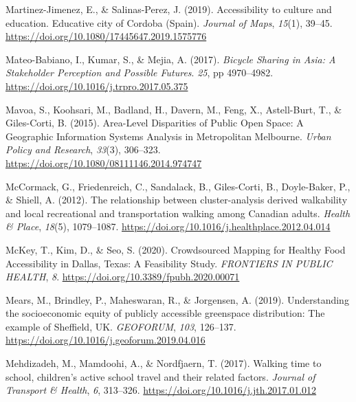 \documentclass[
  letterpaper,
  DIV=11,
  numbers=noendperiod]{scrartcl}
\newlength{\cslhangindent}
\newenvironment{CSLReferences}[2] %
 {\begin{list}{}{%
  \setlength{\itemindent}{0pt}
  \setlength{\leftmargin}{0pt}
  \setlength{\parsep}{0pt}
  \ifodd #1
   \setlength{\leftmargin}{\cslhangindent}
   \setlength{\itemindent}{-1\cslhangindent}
  \fi
  \setlength{\itemsep}{#2\baselineskip}}}
 {\end{list}}
\begin{document}
\begin{CSLReferences}{1}{0}
Martinez-Jimenez, E., \& Salinas-Perez, J. (2019). Accessibility to
culture and education. {Educative} city of {Cordoba} ({Spain}).
\emph{Journal of Maps}, \emph{15}(1), 39--45.
\url{https://doi.org/10.1080/17445647.2019.1575776}

Mateo-Babiano, I., Kumar, S., \& Mejia, A. (2017). \emph{Bicycle
{Sharing} in {Asia}: {A Stakeholder Perception} and {Possible Futures}}.
\emph{25}, pp 4970--4982.
\url{https://doi.org/10.1016/j.trpro.2017.05.375}

Mavoa, S., Koohsari, M., Badland, H., Davern, M., Feng, X., Astell-Burt,
T., \& Giles-Corti, B. (2015). Area-{Level Disparities} of {Public Open
Space}: {A Geographic Information Systems Analysis} in {Metropolitan
Melbourne}. \emph{Urban Policy and Research}, \emph{33}(3), 306--323.
\url{https://doi.org/10.1080/08111146.2014.974747}

McCormack, G., Friedenreich, C., Sandalack, B., Giles-Corti, B.,
Doyle-Baker, P., \& Shiell, A. (2012). The relationship between
cluster-analysis derived walkability and local recreational and
transportation walking among {Canadian} adults. \emph{Health \& Place},
\emph{18}(5), 1079--1087.
\url{https://doi.org/10.1016/j.healthplace.2012.04.014}

McKey, T., Kim, D., \& Seo, S. (2020). Crowdsourced {Mapping} for
{Healthy Food Accessibility} in {Dallas}, {Texas}: {A Feasibility
Study}. \emph{FRONTIERS IN PUBLIC HEALTH}, \emph{8}.
\url{https://doi.org/10.3389/fpubh.2020.00071}

Mears, M., Brindley, P., Maheswaran, R., \& Jorgensen, A. (2019).
Understanding the socioeconomic equity of publicly accessible greenspace
distribution: {The} example of {Sheffield}, {UK}. \emph{GEOFORUM},
\emph{103}, 126--137.
\url{https://doi.org/10.1016/j.geoforum.2019.04.016}

Mehdizadeh, M., Mamdoohi, A., \& Nordfjaern, T. (2017). Walking time to
school, children's active school travel and their related factors.
\emph{Journal of Transport \& Health}, \emph{6}, 313--326.
\url{https://doi.org/10.1016/j.jth.2017.01.012}


\end{CSLReferences}
\end{document}
